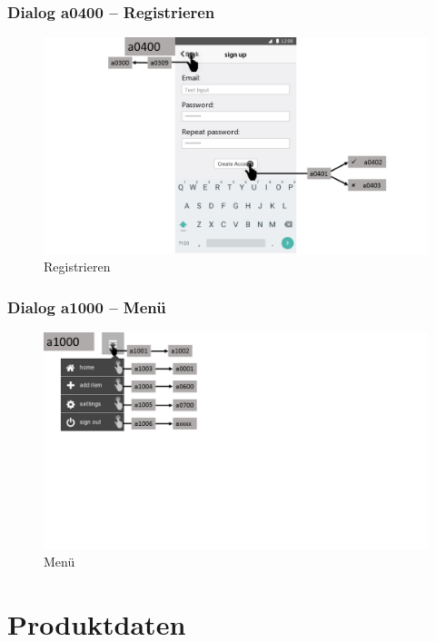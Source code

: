 \documentclass[a4paper,12pt,oneside]{scrartcl}
\begin{document}
\subsubsection{Dialog a0400 – Registrieren}
\begin{figure}[!htbp]
\centering
\noindent\includegraphics[width=\linewidth,height=\textheight,keepaspectratio]{Dialoge/Folie5}
\caption{Registrieren}
\end{figure}
\FloatBarrier

\subsubsection{Dialog a1000 – Menü}
\begin{figure}[!htbp]
\centering
\noindent\includegraphics[width=\linewidth,height=\textheight,keepaspectratio]{Dialoge/Folie10}
\caption{Menü}
\end{figure}
\FloatBarrier


\section{Produktdaten}
\end{document}
